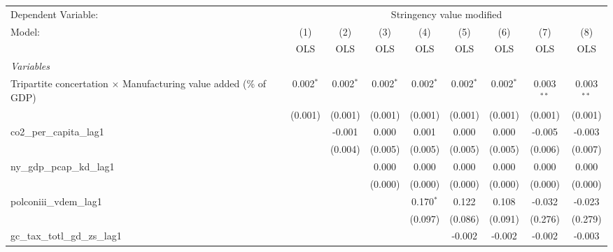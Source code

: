 
\begingroup
\centering
\begin{tabular}{lcccccccc}
   \toprule
   Dependent Variable: & \multicolumn{8}{c}{Stringency value modified}\\
   Model:                                                                   & (1)         & (2)         & (3)         & (4)         & (5)         & (6)         & (7)          & (8)\\  
                                                                            &  OLS        & OLS         & OLS         & OLS         & OLS         & OLS         & OLS          & OLS\\  
   \midrule
   \emph{Variables}\\
   Tripartite concertation $\times$ Manufacturing value added (\% of GDP)   & 0.002$^{*}$ & 0.002$^{*}$ & 0.002$^{*}$ & 0.002$^{*}$ & 0.002$^{*}$ & 0.002$^{*}$ & 0.003$^{**}$ & 0.003$^{**}$\\   
                                                                            & (0.001)     & (0.001)     & (0.001)     & (0.001)     & (0.001)     & (0.001)     & (0.001)      & (0.001)\\   
   co2\_per\_capita\_lag1                                                   &             & -0.001      & 0.000       & 0.001       & 0.000       & 0.000       & -0.005       & -0.003\\   
                                                                            &             & (0.004)     & (0.005)     & (0.005)     & (0.005)     & (0.005)     & (0.006)      & (0.007)\\   
   ny\_gdp\_pcap\_kd\_lag1                                                  &             &             & 0.000       & 0.000       & 0.000       & 0.000       & 0.000        & 0.000\\   
                                                                            &             &             & (0.000)     & (0.000)     & (0.000)     & (0.000)     & (0.000)      & (0.000)\\   
   polconiii\_vdem\_lag1                                                    &             &             &             & 0.170$^{*}$ & 0.122       & 0.108       & -0.032       & -0.023\\   
                                                                            &             &             &             & (0.097)     & (0.086)     & (0.091)     & (0.276)      & (0.279)\\   
   gc\_tax\_totl\_gd\_zs\_lag1                                              &             &             &             &             & -0.002      & -0.002      & -0.002       & -0.003\\   

\end{tabular}
